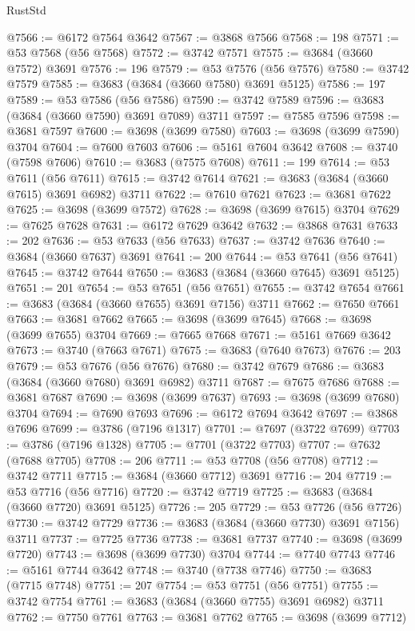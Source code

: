 \begin{lexlean}{RustStd}
\begin{coremodule}
@7566 := @6172 @7564 @3642
@7567 := @3868 @7566
@7568 := 198
@7571 := @53 @7568 (@56 @7568)
@7572 := @3742 @7571
@7575 := @3684 (@3660 @7572) @3691
@7576 := 196
@7579 := @53 @7576 (@56 @7576)
@7580 := @3742 @7579
@7585 := @3683 (@3684 (@3660 @7580) @3691 @5125)
@7586 := 197
@7589 := @53 @7586 (@56 @7586)
@7590 := @3742 @7589
@7596 := @3683 (@3684 (@3660 @7590) @3691 @7089) @3711
@7597 := @7585 @7596
@7598 := @3681 @7597
@7600 := @3698 (@3699 @7580)
@7603 := @3698 (@3699 @7590) @3704
@7604 := @7600 @7603
@7606 := @5161 @7604 @3642
@7608 := @3740 (@7598 @7606)
@7610 := @3683 (@7575 @7608)
@7611 := 199
@7614 := @53 @7611 (@56 @7611)
@7615 := @3742 @7614
@7621 := @3683 (@3684 (@3660 @7615) @3691 @6982) @3711
@7622 := @7610 @7621
@7623 := @3681 @7622
@7625 := @3698 (@3699 @7572)
@7628 := @3698 (@3699 @7615) @3704
@7629 := @7625 @7628
@7631 := @6172 @7629 @3642
@7632 := @3868 @7631
@7633 := 202
@7636 := @53 @7633 (@56 @7633)
@7637 := @3742 @7636
@7640 := @3684 (@3660 @7637) @3691
@7641 := 200
@7644 := @53 @7641 (@56 @7641)
@7645 := @3742 @7644
@7650 := @3683 (@3684 (@3660 @7645) @3691 @5125)
@7651 := 201
@7654 := @53 @7651 (@56 @7651)
@7655 := @3742 @7654
@7661 := @3683 (@3684 (@3660 @7655) @3691 @7156) @3711
@7662 := @7650 @7661
@7663 := @3681 @7662
@7665 := @3698 (@3699 @7645)
@7668 := @3698 (@3699 @7655) @3704
@7669 := @7665 @7668
@7671 := @5161 @7669 @3642
@7673 := @3740 (@7663 @7671)
@7675 := @3683 (@7640 @7673)
@7676 := 203
@7679 := @53 @7676 (@56 @7676)
@7680 := @3742 @7679
@7686 := @3683 (@3684 (@3660 @7680) @3691 @6982) @3711
@7687 := @7675 @7686
@7688 := @3681 @7687
@7690 := @3698 (@3699 @7637)
@7693 := @3698 (@3699 @7680) @3704
@7694 := @7690 @7693
@7696 := @6172 @7694 @3642
@7697 := @3868 @7696
@7699 := @3786 (@7196 @1317)
@7701 := @7697 (@3722 @7699)
@7703 := @3786 (@7196 @1328)
@7705 := @7701 (@3722 @7703)
@7707 := @7632 (@7688 @7705)
@7708 := 206
@7711 := @53 @7708 (@56 @7708)
@7712 := @3742 @7711
@7715 := @3684 (@3660 @7712) @3691
@7716 := 204
@7719 := @53 @7716 (@56 @7716)
@7720 := @3742 @7719
@7725 := @3683 (@3684 (@3660 @7720) @3691 @5125)
@7726 := 205
@7729 := @53 @7726 (@56 @7726)
@7730 := @3742 @7729
@7736 := @3683 (@3684 (@3660 @7730) @3691 @7156) @3711
@7737 := @7725 @7736
@7738 := @3681 @7737
@7740 := @3698 (@3699 @7720)
@7743 := @3698 (@3699 @7730) @3704
@7744 := @7740 @7743
@7746 := @5161 @7744 @3642
@7748 := @3740 (@7738 @7746)
@7750 := @3683 (@7715 @7748)
@7751 := 207
@7754 := @53 @7751 (@56 @7751)
@7755 := @3742 @7754
@7761 := @3683 (@3684 (@3660 @7755) @3691 @6982) @3711
@7762 := @7750 @7761
@7763 := @3681 @7762
@7765 := @3698 (@3699 @7712)

\end{coremodule}
\end{lexlean}
